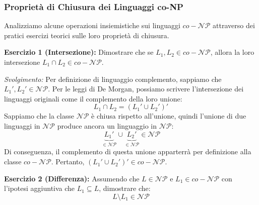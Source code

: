 \begin{center}
\end{center}

\vspace{0.6cm}

\subsubsection{Proprietà di Chiusura dei Linguaggi co-NP}

Analizziamo alcune operazioni insiemistiche sui linguaggi $co-\mathcal{NP}$ attraverso dei pratici esercizi teorici sulle loro proprietà di chiusura.

\textbf{Esercizio 1 (Intersezione):} 
Dimostrare che se $L_1, L_2 \in co-\mathcal{NP}$, allora la loro intersezione $L_1 \cap L_2 \in co-\mathcal{NP}$.

\textit{Svolgimento:}
Per definizione di linguaggio complemento, sappiamo che $L_1', L_2' \in \mathcal{NP}$.
Per le leggi di De Morgan, possiamo scrivere l'intersezione dei linguaggi originali come il complemento della loro unione:
$$ L_1 \cap L_2 = (L_1' \cup L_2')' $$
Sappiamo che la classe $\mathcal{NP}$ è chiusa rispetto all'unione, quindi l'unione di due linguaggi in $\mathcal{NP}$ produce ancora un linguaggio in $\mathcal{NP}$:
$$ \underbrace{L_1'}_{\in \mathcal{NP}} \cup \underbrace{L_2'}_{\in \mathcal{NP}} \in \mathcal{NP} $$
Di conseguenza, il complemento di questa unione apparterrà per definizione alla classe $co-\mathcal{NP}$. Pertanto, $(L_1' \cup L_2')' \in co-\mathcal{NP}$.

\vspace{0.8cm}

\textbf{Esercizio 2 (Differenza):}
Assumendo che $L \in \mathcal{NP}$ e $L_1 \in co-\mathcal{NP}$ con l'ipotesi aggiuntiva che $L_1 \subseteq L$, dimostrare che:
$$ L \setminus L_1 \in \mathcal{NP} $$

